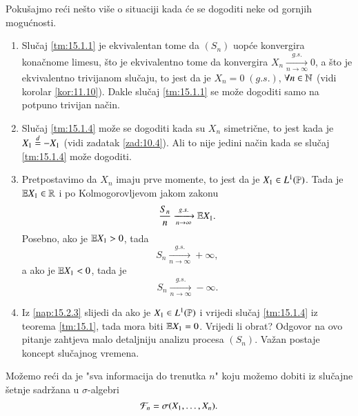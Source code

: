 \begin{nap} \label{nap:15.2}
    Poku\v sajmo re\' ci ne\v sto vi\v se o situaciji kada \' ce se dogoditi neke od gornjih mogu\' cnosti.
    \begin{enumerate}[label=(\alph*)]
        \item Slu\v caj \ref{tm:15.1.1} je ekvivalentan tome da $(S_n)$ uop\' ce konvergira kona\v cnome limesu, \v sto je ekvivalentno tome da konvergira $X_n \xrightarrow[n \to \infty]{g.s.} 0$, a \v sto je ekvivalentno trivijanom slu\v caju, to jest da je $X_n = 0 \; (g.s.)$, $\forall n \in \mathbb{N}$ (vidi korolar \ref{kor:11.10}).
        Dakle slu\v caj \ref{tm:15.1.1} se mo\v ze dogoditi samo na potpuno trivijan na\v cin.
        \item Slu\v caj \ref{tm:15.1.4} mo\v ze se dogoditi kada su $X_n$ simetri\v cne, to jest kada je $X_1 \overset{d}{=} - X_1$ (vidi zadatak \ref{zad:10.4}).
        Ali to nije jedini na\v cin kada se slu\v caj \ref{tm:15.1.4} mo\v ze dogoditi.
        \item \label{nap:15.2.3}
        Pretpostavimo da $X_n$ imaju prve momente, to jest da je $X_1 \in L^1(\mathbb{P})$.
        Tada je $\mathbb{E} X_1 \in \mathbb{R}$ i po Kolmogorovljevom jakom zakonu
        \begin{equation*}
            \frac{S_n}{n} \xrightarrow[n \to \infty]{g.s.} \mathbb{E} X_1.
        \end{equation*}
        Posebno, ako je $\mathbb{E} X_1 > 0$, tada
        \begin{equation*}
            S_n \xrightarrow[n \to \infty]{g.s.} +\infty,
        \end{equation*}
        a ako je $\mathbb{E} X_1 < 0$, tada je
        \begin{equation*}
            S_n \xrightarrow[n \to \infty]{g.s.} - \infty.
        \end{equation*}
        \item Iz \ref{nap:15.2.3} slijedi da ako je $X_1 \in L^1 (\mathbb{P})$ i vrijedi slu\v caj \ref{tm:15.1.4} iz teorema \ref{tm:15.1}, tada mora biti $\mathbb{E} X_1 = 0$.
        Vrijedi li obrat?
        Odgovor na ovo pitanje zahtjeva malo detaljniju analizu procesa $(S_n)$.
        Va\v zan postaje koncept slu\v cajnog vremena.
    \end{enumerate}
\end{nap}

Mo\v zemo re\' ci da je "sva informacija do trenutka $n$" koju mo\v zemo dobiti iz slu\v cajne \v setnje sadr\v zana u $\sigma$-algebri
\begin{equation*}
    \mathcal{F}_n = \sigma({X_1, \ldots, X_n}).
\end{equation*}


